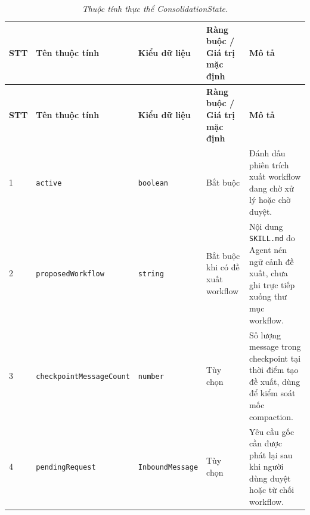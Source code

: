 \begin{longtable}{|p{0.55cm}|p{2.55cm}|p{2.7cm}|p{3.25cm}|p{4.0cm}|}
\caption{\emph{Thuộc tính thực thể ConsolidationState.}}\label{tab:erd-consolidation-state}\\
\hline
\textbf{STT} & \textbf{Tên thuộc tính} & \textbf{Kiểu dữ liệu} & \textbf{Ràng buộc / Giá trị mặc định} & \textbf{Mô tả} \\
\hline
\endfirsthead
\hline
\textbf{STT} & \textbf{Tên thuộc tính} & \textbf{Kiểu dữ liệu} & \textbf{Ràng buộc / Giá trị mặc định} & \textbf{Mô tả} \\
\hline
\endhead
1 & \texttt{active} & \texttt{boolean} & Bắt buộc & Đánh dấu phiên trích xuất workflow đang chờ xử lý hoặc chờ duyệt. \\
\hline
2 & \texttt{proposed}\newline\texttt{Workflow} & \texttt{string} & Bắt buộc khi có đề xuất workflow & Nội dung \texttt{SKILL.md} do Agent nén ngữ cảnh đề xuất, chưa ghi trực tiếp xuống thư mục workflow. \\
\hline
3 & \texttt{checkpoint}\newline\texttt{MessageCount} & \texttt{number} & Tùy chọn & Số lượng message trong checkpoint tại thời điểm tạo đề xuất, dùng để kiểm soát mốc compaction. \\
\hline
4 & \texttt{pendingRequest} & \texttt{InboundMessage} & Tùy chọn & Yêu cầu gốc cần được phát lại sau khi người dùng duyệt hoặc từ chối workflow. \\
\hline
\end{longtable}

